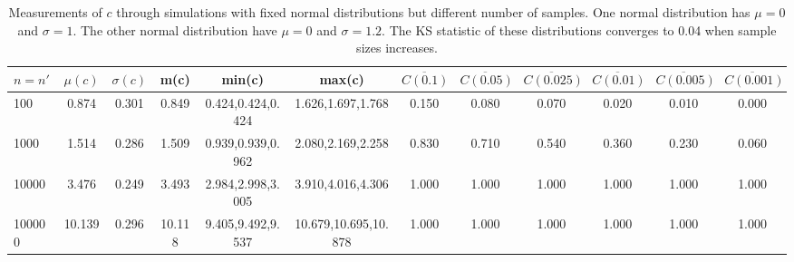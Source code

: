 \begin{table*}[h!]
\begin{center}
\begin{tabular}{| l | c | c | c | c | c | c | c | c | c | c | c |}\hline
$n=n'$ & $\mu(c)$ & $\sigma(c)$ & m(c) & min(c) & max(c) & $\overline{C(0.1)}$ & $\overline{C(0.05)}$ & $\overline{C(0.025)}$ & $\overline{C(0.01)}$ & $\overline{C(0.005)}$ & $\overline{C(0.001)}$ \\\hline
100 & 0.874 & 0.301 & 0.849 & 0.424,0.424,0.424 & 1.626,1.697,1.768  & 0.150  & 0.080  & 0.070  & 0.020  & 0.010  & 0.000 \\\hline
1000 & 1.514 & 0.286 & 1.509 & 0.939,0.939,0.962 & 2.080,2.169,2.258  & 0.830  & 0.710  & 0.540  & 0.360  & 0.230  & 0.060 \\\hline
10000 & 3.476 & 0.249 & 3.493 & 2.984,2.998,3.005 & 3.910,4.016,4.306  & 1.000  & 1.000  & 1.000  & 1.000  & 1.000  & 1.000 \\\hline
100000 & 10.139 & 0.296 & 10.118 & 9.405,9.492,9.537 & 10.679,10.695,10.878  & 1.000  & 1.000  & 1.000  & 1.000  & 1.000  & 1.000 \\\hline
\end{tabular}
\caption{Measurements of $c$ through simulations
        with fixed normal distributions but different number of samples.
        One normal distribution has $\mu=0$ and $\sigma=1$.
        The other normal distribution have
        $\mu=0$ and $\sigma=1.2$.
        The KS statistic of these distributions converges
        to 0.04 when sample sizes increases.}
\end{center}
\end{table*}